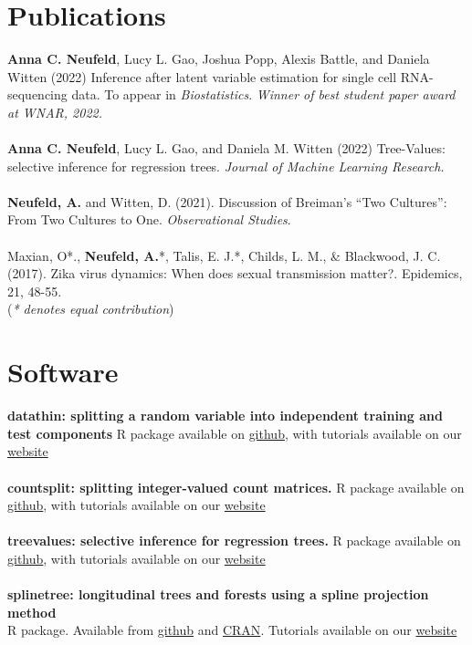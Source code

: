 \documentclass[margin, 10pt]{res} %
\begin{document}
\begin{resume}
\section{Publications} 
\textbf{Anna C. Neufeld}, Lucy L. Gao, Joshua Popp, Alexis Battle, and Daniela Witten (2022) Inference after latent variable estimation for single cell RNA-sequencing data. To appear in \emph{Biostatistics}. \emph{Winner of best student paper award at WNAR, 2022.}  \\
\\
\textbf{Anna C. Neufeld}, Lucy L. Gao, and Daniela M. Witten (2022) Tree-Values: selective inference for regression trees. \emph{Journal of Machine Learning Research.}\\
\\
\textbf{Neufeld, A.} and Witten, D. (2021). Discussion of Breiman’s “Two Cultures”: From Two Cultures to One. \emph{Observational Studies}.  \\
\\
Maxian, O*., \textbf{Neufeld, A.}*, Talis, E. J.*, Childs, L. M., \& Blackwood, J. C. (2017). Zika virus dynamics: When does sexual transmission matter?. Epidemics, 21, 48-55. \\
\small
(\emph{* denotes equal contribution})
\normalsize


\section{Software} 
\textbf{datathin: splitting a random variable into independent training and test components } R package available on \href{https://github.com/anna-neufeld/datathin}{github}, with tutorials available on our \href{https://anna-neufeld.github.io/datathin/}{website} \\
\\
\textbf{countsplit: splitting integer-valued count matrices.} R package available on \href{https://github.com/anna-neufeld/countsplit}{github}, with tutorials available on our \href{https://anna-neufeld.github.io/countsplit.tutorials/}{website} \\
\\
\textbf{treevalues: selective inference for regression trees.} R package available on \href{https://github.com/anna-neufeld/treevalues}{github}, with tutorials available on our \href{https://anna-neufeld.github.io/treevalues/articles/overview.html}{website} \\
\\
\textbf{splinetree: longitudinal trees and forests using a spline projection method} \\
R package. Available from \href{https://github.com/anna-neufeld/splinetree}{github} and \href{https://cran.r-project.org/web/packages/splinetree/index.html}{CRAN}. Tutorials available on our \href{https://anna-neufeld.github.io/splinetree/}{website}



\end{resume}
\end{document}
